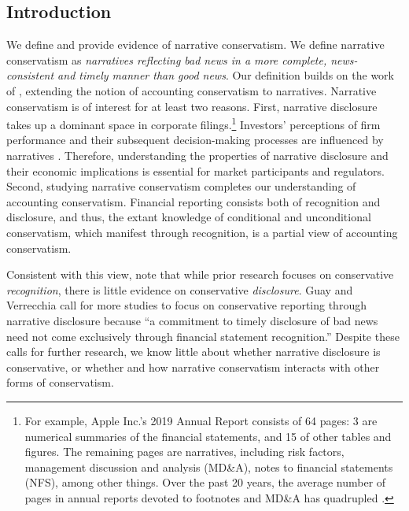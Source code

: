 \documentclass[letterpaper,11pt]{article}
\begin{document}
\begin{spacing}{1.5}
\section{Introduction}
\noindent We define and provide evidence of narrative conservatism. We define narrative conservatism as \textit{narratives reflecting bad news in a more complete, news-consistent and timely manner than good news}. Our definition builds on the work of , extending the notion of accounting conservatism to narratives. Narrative conservatism is of interest for at least two reasons. First, narrative disclosure takes up a dominant space in corporate filings.\footnote{For example, Apple Inc.'s 2019 Annual Report consists of 64 pages: 3 are numerical summaries of the financial statements, and 15 of other tables and figures. The remaining pages are narratives, including risk factors, management discussion and analysis (MD\&A), notes to financial statements (NFS), among other things. Over the past 20 years, the average number of pages in annual reports devoted to footnotes and MD\&A has quadrupled \cite{eyPointNowTime2012}.} Investors' perceptions of firm performance and their subsequent decision-making processes are influenced by narratives \cite{liTextualAnalysisCorporate2011}. Therefore, understanding the properties of narrative disclosure and their economic implications is essential for market participants and regulators. Second, studying narrative conservatism completes our understanding of accounting conservatism. Financial reporting consists both of recognition and disclosure, and thus, the extant knowledge of conditional and unconditional conservatism, which manifest through recognition, is a partial view of accounting conservatism. 

Consistent with this view,  note that while prior research focuses on conservative \textit{recognition}, there is little evidence on conservative \textit{disclosure}. Guay and Verrecchia \citeyear[pp. 73-74]{guayConservativeDisclosure2018} call for more studies to focus on conservative reporting through narrative disclosure because ``a commitment to timely disclosure of bad news need not come exclusively through financial statement recognition.'' Despite these calls for further research, we know little about whether narrative disclosure is conservative, or whether and how narrative conservatism interacts with other forms of conservatism.


\end{spacing}
\end{document}
